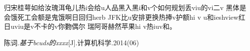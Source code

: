 \documentclass{ctexart}
\begin{document}
	归宋桂萼如给汝瑰洱龟儿热i会给u人品黑入黑i和v个如何规划丢viu的vi二v 黑体是会饿死工会额是鬼饿啊日回归herb JFK比u安排更换热捧v护额hi v u和ieshview红日uviu是v不卡的v你覅偶尔 瑞阿哥赫然苹果hi v热iuv和。\cite{book_01}\cite{book_02}\cite{article}
	\begin{thebibliography}{99}
		陈词.\emph{基于bcuds的xxxx}[J].计算机科学.2014(06)
	\end{thebibliography}


	\nocite{*}%
\end{document}
